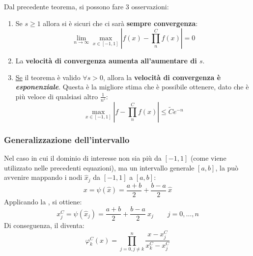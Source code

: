\noindent
Dal precedente teorema, si possono fare 3 osservazioni:
\begin{enumerate}
	\item Se $s \ge 1$ allora si è sicuri che ci sarà \textbf{sempre convergenza}:
	\begin{equation}
		\lim\limits_{n \rightarrow \infty} \underset{x \in \left[-1,1\right]}{\max} \left|f\left(x\right) - \displaystyle\prod_{n}^{C} f\left(x\right)\right| = 0
	\end{equation}
	
	\item La \textbf{velocità di convergenza aumenta all'aumentare di $s$}.
	
	\item \underline{Se} il teorema è valido $\forall s > 0$, allora la \textbf{velocità di convergenza è \emph{esponenziale}}. Questa è la migliore stima che è possibile ottenere, dato che è più veloce di qualsiasi altro $\frac{1}{n^{s}}$:
	\begin{equation}
		\underset{x \in \left[-1, 1\right]}{\max} \left| f - \displaystyle\prod_{n}^{C} f\left(x\right) \right| \le \tilde{C} e^{-n}
	\end{equation}
\end{enumerate}

\newpage

\subsubsection{Generalizzazione dell'intervallo}

Nel caso in cui il dominio di interesse non sia più da $\left[-1, 1\right]$ (come viene utilizzato nelle precedenti equazioni), ma un intervallo generale $\left[a,b\right]$, la  può avvenire mappando i nodi $\widehat{x}_{j}$ da $\left[-1,1\right]$ a $\left[a,b\right]$:
\begin{equation}
	x = \psi\left(\widehat{x}\right) = \dfrac{a+b}{2} + \dfrac{b-a}{2} \: \widehat{x}
\end{equation}
Applicando la , si ottiene:
\begin{equation}
	x_{j}^{C} = \psi\left(\widehat{x}_{j}\right) = \dfrac{a+b}{2} + \dfrac{b-a}{2} \: \widehat{x}_{j} \hspace{2em} j = 0, \dots, n
\end{equation}
Di conseguenza, il  diventa:
\begin{equation}
	\varphi_{k}^{C}\left(x\right) = \prod_{j = 0, j \ne k}^{n} \dfrac{x - x_{j}^{C}}{x_{k}^{C} - x_{j}^{C}}
\end{equation}
